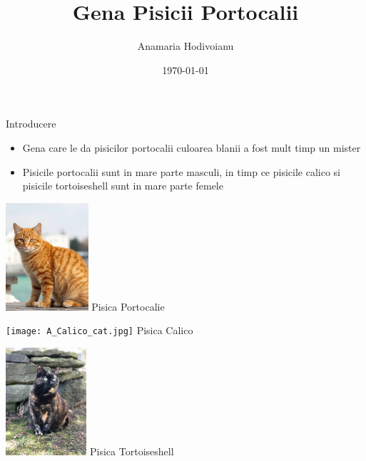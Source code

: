 \documentclass{beamer}
\title{Gena Pisicii Portocalii}
\author{Anamaria Hodivoianu}
\date{\today}
\begin{document}
\begin{frame}
    \titlepage
\end{frame}

\begin{frame}{Introducere}
    \begin{itemize}
        \item Gena care le da pisicilor portocalii culoarea blanii a fost mult timp un mister
        \item Pisicile portocalii sunt in mare parte masculi, in timp ce pisicile calico si pisicile tortoiseshell sunt in mare parte femele
    \end{itemize}
    \vspace{0.1cm}
    \centering
    \begin{minipage}{0.3\textwidth}
        \centering
        \includegraphics[height=4cm]{orange-tabby-cat-783x1024.jpg}
        \small Pisica Portocalie
    \end{minipage}
    \begin{minipage}{0.3\textwidth}
        \centering
        \texttt{[image: A\_Calico\_cat.jpg]}
        \small Pisica Calico
    \end{minipage}
    \hfill
    \begin{minipage}{0.3\textwidth}
        \centering
        \includegraphics[height=4cm]{Short-haired_tortoiseshell_cat.jpg}
        \small Pisica Tortoiseshell
    \end{minipage}
\end{frame}
\end{document}
